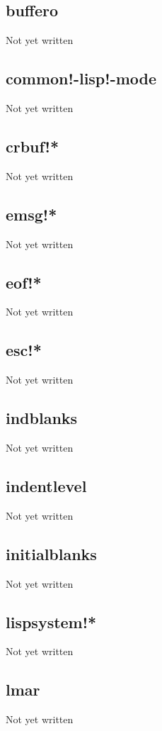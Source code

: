 \documentclass[a4paper,11pt]{article}
\begin{document}
\subsection{\ttfamily buffero}
Not yet written

\subsection{\ttfamily common!-lisp!-mode}
Not yet written

\subsection{\ttfamily crbuf!*}
Not yet written

\subsection{\ttfamily emsg!*}
Not yet written

\subsection{\ttfamily eof!*}
Not yet written

\subsection{\ttfamily esc!*}
Not yet written

\subsection{\ttfamily indblanks}
Not yet written

\subsection{\ttfamily indentlevel}
Not yet written

\subsection{\ttfamily initialblanks}
Not yet written

\subsection{\ttfamily lispsystem!*}
Not yet written

\subsection{\ttfamily lmar}
Not yet written
\end{document}

